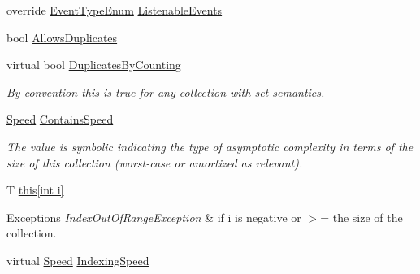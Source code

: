 \begin{DoxyCompactItemize}
\item 
override \hyperlink{namespace_c5_a9143bfd561fffa025d21561674758008}{Event\+Type\+Enum} \hyperlink{class_c5_1_1_tree_set_aebb5b753eabbe0bae5a02e7d3559b4c9}{Listenable\+Events}
\item 
bool \hyperlink{class_c5_1_1_tree_set_aca61596a366f80a108322652c0c29da8}{Allows\+Duplicates}
\item 
virtual bool \hyperlink{class_c5_1_1_tree_set_a6dac74cd43551ac2462fed3bff68f302}{Duplicates\+By\+Counting}
\begin{DoxyCompactList}\small\item\em By convention this is true for any collection with set semantics. \end{DoxyCompactList}\item 
\hyperlink{namespace_c5_a615ba88dcdaa8d5a3c5f833a73d7fad6}{Speed} \hyperlink{class_c5_1_1_tree_set_a124c0cee22a8f1ae363e9d37a9e5fc0f}{Contains\+Speed}
\begin{DoxyCompactList}\small\item\em The value is symbolic indicating the type of asymptotic complexity in terms of the size of this collection (worst-\/case or amortized as relevant). \end{DoxyCompactList}\item 
T \hyperlink{class_c5_1_1_tree_set_a86dcea1de135e2f495922fffd43ee53f}{this\mbox{[}int i\mbox{]}}
\begin{DoxyCompactList}\small\item\em 
\begin{DoxyExceptions}{Exceptions}
{\em Index\+Out\+Of\+Range\+Exception} & if i is negative or $>$= the size of the collection. \\
\hline
\end{DoxyExceptions}
\end{DoxyCompactList}\item 
virtual \hyperlink{namespace_c5_a615ba88dcdaa8d5a3c5f833a73d7fad6}{Speed} \hyperlink{class_c5_1_1_tree_set_aba57c5ba1783858941dbd3f3fd14abba}{Indexing\+Speed}

\end{DoxyCompactItemize}
